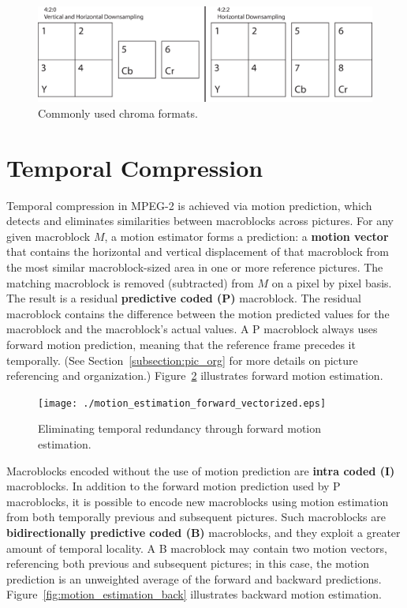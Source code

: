 \begin{figure}
  \begin{center}
    \includegraphics[scale=0.4, angle=0]{./chroma_formats.eps}
    \caption{Commonly used chroma formats.}
    \label{fig:chroma_format}
  \end{center}
\end{figure}

\section{Temporal Compression}

Temporal compression in MPEG-2 is achieved via motion prediction,
which detects and eliminates similarities between macroblocks across
pictures. For any given macroblock $M$, a motion estimator forms a prediction: a \textbf{motion
vector} that contains the horizontal and vertical displacement of that 
macroblock from the most similar macroblock-sized area in one or more reference pictures.
The matching macroblock
is removed (subtracted) from $M$ on a pixel by pixel
basis. The
result is a residual \textbf{predictive coded (P)} macroblock. The residual 
macroblock contains the difference between the motion predicted values for
the macroblock and the macroblock's actual values. A P macroblock
always uses forward motion prediction, meaning that the reference frame
precedes it temporally. (See Section~\ref{subsection:pic_org} for more details on
picture referencing and organization.) Figure~\ref{fig:motion_estimation_forward} illustrates
forward motion estimation.

\begin{figure}[h]
  \begin{center}
    \texttt{[image: ./motion\_estimation\_forward\_vectorized.eps]}
    \caption{Eliminating temporal redundancy through forward motion estimation.}
    \label{fig:motion_estimation_forward}
  \end{center}
\end{figure}

Macroblocks encoded without the use of motion
prediction are \textbf{intra coded (I)} macroblocks. 
In addition to the forward motion 
prediction used by P macroblocks, it is possible to 
encode new macroblocks using motion
estimation from both temporally previous and subsequent pictures. Such macroblocks
are \textbf{bidirectionally predictive coded (B)} macroblocks, and they exploit a
greater amount of temporal locality. A B macroblock may contain two motion vectors, 
referencing both previous and subsequent pictures; in this case, the 
motion prediction
is an unweighted average of the forward and backward predictions. 
Figure~\ref{fig:motion_estimation_back}
illustrates backward motion estimation.

